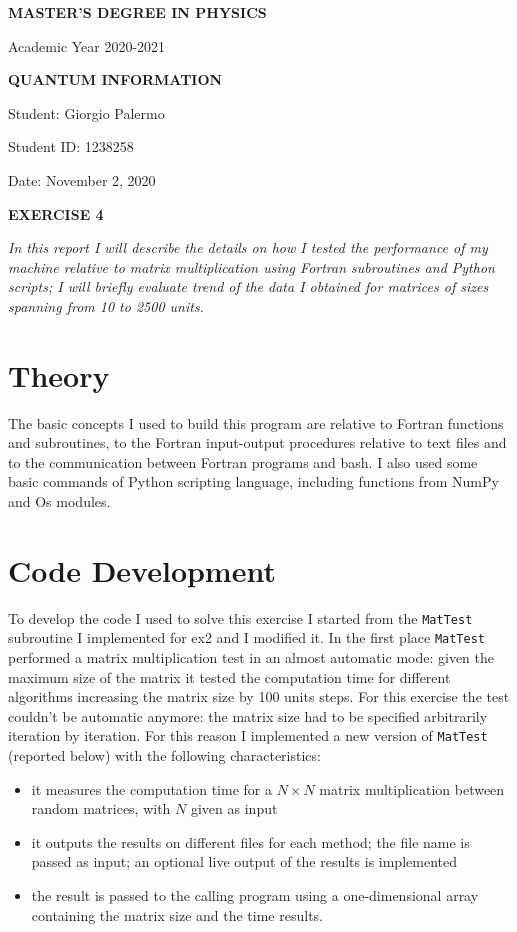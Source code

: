 \documentclass[a4paper]{article}
\newcommand{\thedate}{November 2, 2020}
\begin{document}
\hypersetup{linkcolor = black}
\hypersetup{linkcolor = blue}
\thispagestyle{plain}
\begin{center}
    \textbf{MASTER'S DEGREE IN PHYSICS}
    
    Academic Year 2020-2021
    
    \medskip
    \textbf{QUANTUM INFORMATION}
\end{center}

\vspace{0.0cm}
Student: Giorgio Palermo

Student ID: 1238258

Date: \thedate
\begin{center}
\textbf{EXERCISE 4}
\medskip
\end{center}
\noindent
\textit{In this report I will describe the details on how I tested the performance of my machine relative to matrix multiplication using Fortran subroutines and Python scripts; I will briefly evaluate trend of the data I obtained for matrices of sizes spanning from 10 to 2500 units. }
\section{Theory}
The basic concepts I used to build this program are relative to Fortran functions and subroutines, to the Fortran input-output procedures relative to text files and to the communication between Fortran programs and bash.
I also used some basic commands of Python scripting language, including functions from NumPy and Os modules.

\section*{Code Development}

To develop the code I used to solve this exercise I started from the \lstinline{MatTest} subroutine I implemented for ex2 and I modified it.
In the first place \lstinline{MatTest} performed a matrix multiplication test in an almost automatic mode: given the maximum size of the matrix it tested the computation time for different algorithms increasing the matrix size by 100 units steps.
For this exercise the test couldn't be automatic anymore: the matrix size had to be specified arbitrarily iteration by iteration.
For this reason I implemented a new version of \lstinline{MatTest} (reported below) with the following characteristics:
\begin{itemize}
    \item it measures the computation time for a $N\times N$ matrix multiplication between random matrices, with $N$ given as input
    \item it outputs the results on different files for each method; the file name is passed as input; an optional live output of the results is implemented
    \item the result is passed to the calling program using a one-dimensional array containing the matrix size and the time results.

\end{itemize}
\end{document}
